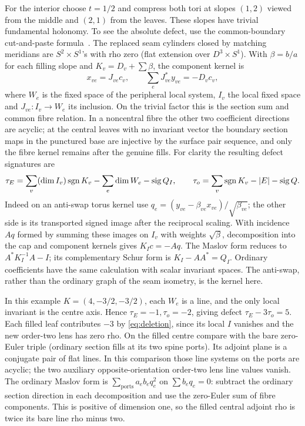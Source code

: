 For the interior choose \(t=1/2\) and compress both tori at slopes \((1,2)\) viewed from the middle and \((2,1)\) from the leaves. These slopes have trivial fundamental holonomy. To see the absolute defect, use the common-boundary cut-and-paste formula~\cite[Thm.\ 3.9]{Toffoli}. The replaced seam cylinders closed by matching meridians are \(S^2\times S^1\)'s with rho zero (flat extension over \(D^3\times S^1\)). With \(\beta=b/a\) for each filling slope and \(K_v=D_v+\sum\beta\), the component kernel is
\[
 x_{ve}=J_{ve}c_v,\qquad \sum_eJ_{ve}^*y_{ve}=-D_v c_v,
\]
where \(W_e\) is the fixed space of the peripheral local system, \(I_v\) the local fixed space and \(J_{ve}:I_v\to W_e\) its inclusion. On the trivial factor this is the section sum and common fibre relation. In a noncentral fibre the other two coefficient directions are acyclic; at the central leaves with no invariant vector the boundary section maps in the punctured base are injective by the surface pair sequence, and only the fibre kernel remains after the genuine fills. For clarity the resulting defect signatures are
\[
 \tau_E=\sum_v(\dim I_v)\operatorname{sgn} K_v-\sum_e\dim W_e-\operatorname{sig} Q_I,\qquad
 \tau_o=\sum_v\operatorname{sgn} K_v-|E|-\operatorname{sig} Q.
\]
Indeed on an anti-swap torus kernel use \(q_e=(y_{ve}-\beta_{ve}x_{ve})/\sqrt{\beta_{ve}}\); the other side is its transported signed image after the reciprocal scaling. With incidence \(Aq\) formed by summing these images on \(I_v\) with weights \(\sqrt\beta\), decomposition into the cap and component kernels gives \(K_I c=-Aq\). The Maslov form reduces to \(A^*K_I^{-1}A-I\); its complementary Schur form is \(K_I-AA^*=Q_I\). Ordinary coefficients have the same calculation with scalar invariant spaces. The anti-swap, rather than the ordinary graph of the seam isometry, is the kernel here.

In this example \(K=(4,-3/2,-3/2)\), each \(W_e\) is a line, and the only local invariant is the centre axis. Hence \(\tau_E=-1,\tau_o=-2\), giving defect \(\tau_E-3\tau_o=5\). Each filled leaf contributes \(-3\) by \eqref{eq:deletion}, since its local \(I\) vanishes and the new order-two lens has zero rho. On the filled centre compare with the bare zero-Euler triple (ordinary section fills at its two spine ports). Its adjoint plane is a conjugate pair of flat lines. In this comparison those line systems on the ports are acyclic; the two auxiliary opposite-orientation order-two lens line values vanish. The ordinary Maslov form is \(\sum_{\text{ports}} a_e b_e q_e^2\) on \(\sum b_e q_e=0\): subtract the ordinary section direction in each decomposition and use the zero-Euler sum of fibre components. This is positive of dimension one, so the filled central adjoint rho is twice its bare line rho minus two.

